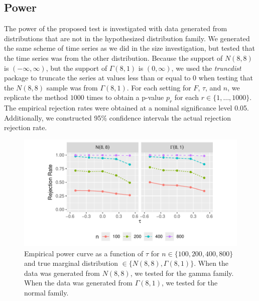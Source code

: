 \documentclass[APA,Times1COL]{WileyNJDv5} %
\begin{document}
\subsection{Power}
The power of the proposed test is investigated with data generated from
distributions that are not in the hypothesized distribution family. 
We generated the same scheme of time series as we did in the size investigation,
but tested that the time series was from the other distribution.
Because the support of $N(8, 8)$ is
$(-\infty, \infty)$, but the support of $\Gamma(8, 1)$ is $(0, \infty)$, we used
the \textsl{truncdist} package \citep{truncdist} to truncate the series at 
values less than or equal to 0 when testing that the $N(8, 8)$ sample was
from $\Gamma(8, 1)$. For each setting for $F$, $\tau$, and $n$, we replicate the 
method $1000$ times 
to obtain a p-value $p_r$ for each $r \in \{1, \ldots, 1000\}$.
The empirical rejection rates were obtained at a nominal significance level 0.05.
Additionally, we constructed 95\% confidence intervals the actual rejection
rejection rate.


\begin{figure}[tbp]
  \centering
  \includegraphics[scale=1]{figures/rr}
  \caption{Empirical power curve as a function of $\tau$ for
    $n \in \{100, 200, 400, 800\}$ and true marginal distribution 
    $\in \{N(8,8), \Gamma(8,1)\}$. When the data was generated from $N(8,8)$,
    we tested for the gamma family. When the data was generated from 
    $\Gamma(8,1)$, we tested for the normal family. 
  }
  \label{fig:rr}
\end{figure}
\end{document}
